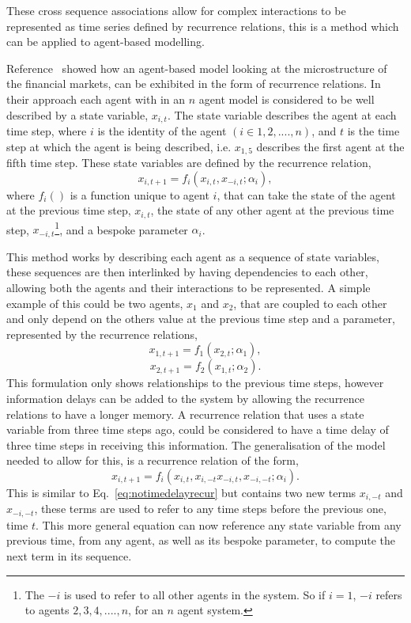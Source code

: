 \documentclass{article}
\begin{document}
These cross sequence associations allow for complex interactions to be represented as time series defined by recurrence relations, this is a method which can be applied to agent-based modelling.

Reference~\cite{econmistsnoabm} showed how an agent-based model looking at the microstructure of the financial markets, can be exhibited in the form of recurrence relations. In their approach each agent with in an $n$ agent model is considered to be well described by a state variable, $x_{i, t}$. The state variable describes the agent at each time step, where $i$ is the identity of the agent $(i \in 1,2,....,n)$, and $t$ is the time step at which the agent is being described, i.e. $x_{1,5}$ describes the first agent at the fifth time step. These state variables are defined by the recurrence relation,     
\begin{equation} \label{eq:notimedelayrecur}
x_{i, t+1} = f_{i}(x_{i, t}, x_{-i,t}; \alpha_{i}),
\end{equation}
where $f_{i}()$ is a function unique to agent $i$, that can take the state of the agent at the previous time step, $x_{i, t}$, the state of any other agent at the previous time step, $x_{-i, t}$\footnote{The $-i$ is used to refer to all other agents in the system. So if $i=1$, $-i$ refers to agents $2,3,4,....,n$, for an $n$ agent system.}, and a bespoke parameter $\alpha_{i}$.

This method works by describing each agent as a sequence of state variables, these sequences are then interlinked by having dependencies to each other, allowing both the agents and their interactions to be represented. A simple example of this could be two agents, $x_{1}$ and $x_{2}$, that are coupled to each other and only depend on the others value at the previous time step and a parameter, represented by the recurrence relations,     
\begin{equation}
x_{1, t+1} = f_{1}(x_{2,t}; \alpha_{1}),
\end{equation}
\begin{equation}
x_{2, t+1} = f_{2}(x_{1,t}; \alpha_{2}).
\end{equation}
This formulation only shows relationships to the previous time steps, however information delays can be added to the system by allowing the recurrence relations to have a longer memory. A recurrence relation that uses a state variable from three time steps ago, could be considered to have a time delay of three time steps in receiving this information. The generalisation of the model needed to allow for this, is a recurrence relation of the form, 
\begin{equation}
x_{i, t+1} = f_{i}(x_{i, t}, x_{i, -t} x_{-i,t}, x_{-i, -t}; \alpha_{i}).
\end{equation}
This is similar to Eq.~\ref{eq:notimedelayrecur} but contains two new terms $x_{i, -t}$ and $x_{-i, -t}$, these terms are used to refer to any time steps before the previous one, time $t$. This more general equation can now reference any state variable from any previous time, from any agent, as well as its bespoke parameter, to compute the next term in its sequence.
 
\end{document}
